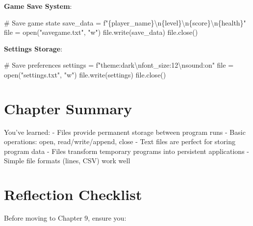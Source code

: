\documentclass[
  letterpaper,
  DIV=11,
  numbers=noendperiod,
  oneside]{scrreprt}
\newenvironment{Shaded}{}{}
\newcommand{\BuiltInTok}[1]{\textcolor[rgb]{0.84,0.23,0.29}{#1}}
\newcommand{\CharTok}[1]{\textcolor[rgb]{0.01,0.18,0.38}{#1}}
\newcommand{\CommentTok}[1]{\textcolor[rgb]{0.42,0.45,0.49}{#1}}
\newcommand{\NormalTok}[1]{\textcolor[rgb]{0.14,0.16,0.18}{#1}}
\newcommand{\OperatorTok}[1]{\textcolor[rgb]{0.14,0.16,0.18}{#1}}
\newcommand{\SpecialCharTok}[1]{\textcolor[rgb]{0.00,0.36,0.77}{#1}}
\newcommand{\SpecialStringTok}[1]{\textcolor[rgb]{0.01,0.18,0.38}{#1}}
\newcommand{\StringTok}[1]{\textcolor[rgb]{0.01,0.18,0.38}{#1}}
\begin{document}
\textbf{Game Save System}:

\begin{Shaded}
\begin{Highlighting}[]
\CommentTok{\# Save game state}
\NormalTok{save\_data }\OperatorTok{=} \SpecialStringTok{f"}\SpecialCharTok{\{}\NormalTok{player\_name}\SpecialCharTok{\}}\CharTok{\textbackslash{}n}\SpecialCharTok{\{}\NormalTok{level}\SpecialCharTok{\}}\CharTok{\textbackslash{}n}\SpecialCharTok{\{}\NormalTok{score}\SpecialCharTok{\}}\CharTok{\textbackslash{}n}\SpecialCharTok{\{}\NormalTok{health}\SpecialCharTok{\}}\SpecialStringTok{"}
\BuiltInTok{file} \OperatorTok{=} \BuiltInTok{open}\NormalTok{(}\StringTok{"savegame.txt"}\NormalTok{, }\StringTok{"w"}\NormalTok{)}
\BuiltInTok{file}\NormalTok{.write(save\_data)}
\BuiltInTok{file}\NormalTok{.close()}
\end{Highlighting}
\end{Shaded}

\textbf{Settings Storage}:

\begin{Shaded}
\begin{Highlighting}[]
\CommentTok{\# Save preferences}
\NormalTok{settings }\OperatorTok{=} \SpecialStringTok{f"theme:dark}\CharTok{\textbackslash{}n}\SpecialStringTok{font\_size:12}\CharTok{\textbackslash{}n}\SpecialStringTok{sound:on"}
\BuiltInTok{file} \OperatorTok{=} \BuiltInTok{open}\NormalTok{(}\StringTok{"settings.txt"}\NormalTok{, }\StringTok{"w"}\NormalTok{)}
\BuiltInTok{file}\NormalTok{.write(settings)}
\BuiltInTok{file}\NormalTok{.close()}
\end{Highlighting}
\end{Shaded}

\section{Chapter Summary}\label{chapter-summary-8}

You've learned: - Files provide permanent storage between program runs -
Basic operations: open, read/write/append, close - Text files are
perfect for storing program data - Files transform temporary programs
into persistent applications - Simple file formats (lines, CSV) work
well

\section{Reflection Checklist}\label{reflection-checklist-7}

Before moving to Chapter 9, ensure you:
\end{document}
